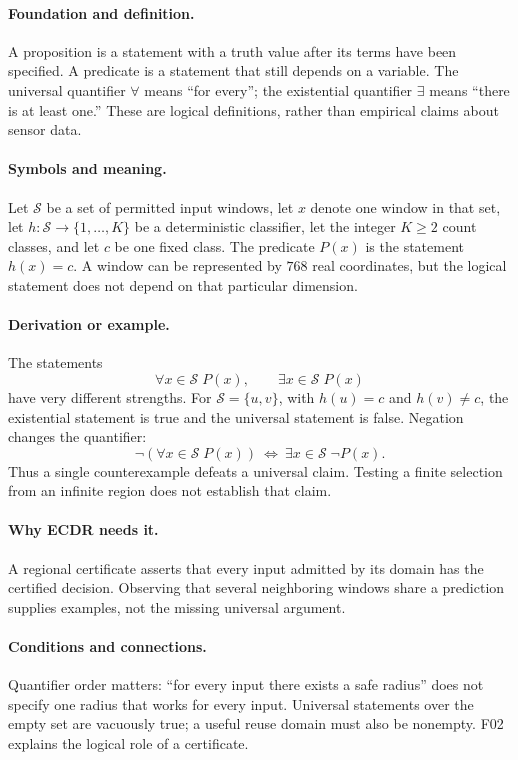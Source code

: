 
\paragraph{Foundation and definition.}
A proposition is a statement with a truth value after its terms have been
specified. A predicate is a statement that still depends on a variable.
The universal quantifier $\forall$ means ``for every''; the existential
quantifier $\exists$ means ``there is at least one.'' These are logical
definitions, rather than empirical claims about sensor data.
\paragraph{Symbols and meaning.}
Let $\mathcal S$ be a set of permitted input windows, let $x$ denote one
window in that set, let $h:\mathcal S\to\{1,\ldots,K\}$ be a deterministic
classifier, let the integer $K\ge2$ count classes, and let $c$ be one fixed
class. The predicate $P(x)$ is the statement $h(x)=c$. A window can be
represented by $768$ real coordinates, but the logical statement does not
depend on that particular dimension.
\paragraph{Derivation or example.}
The statements
\[
 \forall x\in\mathcal S\;P(x),\qquad
 \exists x\in\mathcal S\;P(x)
\]
have very different strengths. For $\mathcal S=\{u,v\}$, with
$h(u)=c$ and $h(v)\ne c$, the existential statement is true and the
universal statement is false. Negation changes the quantifier:
\[
 \neg(\forall x\in\mathcal S\;P(x))
 \ \Longleftrightarrow\ 
 \exists x\in\mathcal S\;\neg P(x).
\]
Thus a single counterexample defeats a universal claim. Testing a finite
selection from an infinite region does not establish that claim.
\paragraph{Why ECDR needs it.}
A regional certificate asserts that every input admitted by its domain
has the certified decision. Observing that several neighboring windows
share a prediction supplies examples, not the missing universal argument.
\paragraph{Conditions and connections.}
Quantifier order matters: ``for every input there exists a safe radius''
does not specify one radius that works for every input. Universal
statements over the empty set are vacuously true; a useful reuse domain
must also be nonempty. F02 explains the logical role of a certificate.

